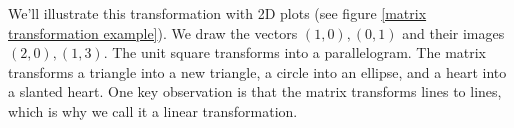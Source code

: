 We'll illustrate this transformation with 2D plots (see figure \ref{matrix transformation example}). We draw the vectors $(1,0),(0,1)$ and their images $(2,0),(1,3)$.  The unit square transforms into a parallelogram. The matrix transforms a triangle into a new triangle, a circle into an ellipse, and a heart into a slanted heart. One key observation is that the matrix transforms lines to lines, which is why we call it a linear transformation. 

\begin{figure}
\begin{center}
\end{center}


\end{figure}
